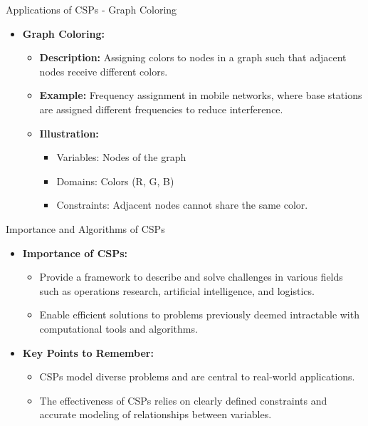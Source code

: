 \documentclass[aspectratio=169]{beamer}
\begin{document}
\begin{frame}[fragile]{Applications of CSPs - Graph Coloring}
    \begin{itemize}
        \item \textbf{Graph Coloring:}
        \begin{itemize}
            \item \textbf{Description:} Assigning colors to nodes in a graph such that adjacent nodes receive different colors.
            \item \textbf{Example:} 
                Frequency assignment in mobile networks, where base stations are assigned different frequencies to reduce interference.
            \item \textbf{Illustration:}
            \begin{itemize}
                \item Variables: Nodes of the graph
                \item Domains: Colors (R, G, B)
                \item Constraints: Adjacent nodes cannot share the same color.
            \end{itemize}
        \end{itemize}
    \end{itemize}
\end{frame}

\begin{frame}[fragile]{Importance and Algorithms of CSPs}
    \begin{itemize}
        \item \textbf{Importance of CSPs:}
        \begin{itemize}
            \item Provide a framework to describe and solve challenges in various fields such as operations research, artificial intelligence, and logistics.
            \item Enable efficient solutions to problems previously deemed intractable with computational tools and algorithms.
        \end{itemize}
        \item \textbf{Key Points to Remember:}
        \begin{itemize}
            \item CSPs model diverse problems and are central to real-world applications.
            \item The effectiveness of CSPs relies on clearly defined constraints and accurate modeling of relationships between variables.
        \end{itemize}
    \end{itemize}
\end{frame}
\end{document}

